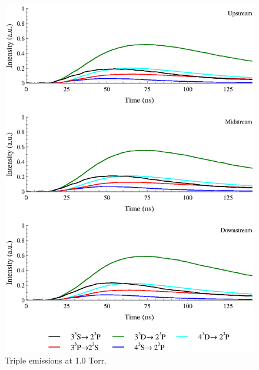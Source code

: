 \begin{figure}
  \centering
  \includegraphics{./chapters/extraem/figures/1torr_t.eps}
  \caption{Triple emissions at 1.0 Torr.}
\end{figure}

